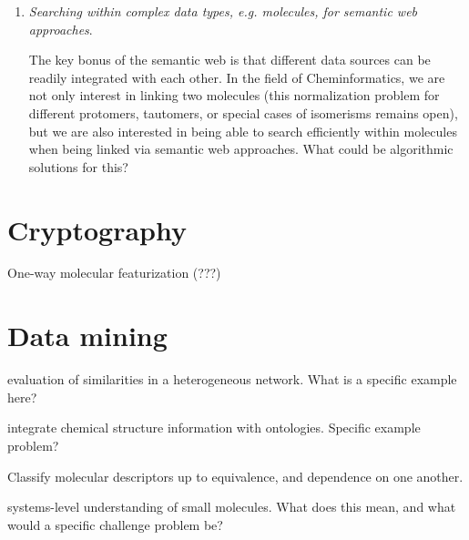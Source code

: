 \documentclass{sig-alternate}
\begin{document}
\begin{enumerate}
\item \emph{Searching within complex data types, e.g. molecules, for semantic web approaches}.

The key bonus of the semantic web is that different data sources can be readily integrated with each other. In the field
of Cheminformatics, we are not only interest in linking two molecules 
(this normalization problem for different protomers, tautomers, or special cases of isomerisms remains open), but we
are also interested in being able to search efficiently within molecules when being linked via semantic web approaches.
What could be algorithmic solutions for this?
\end{enumerate}

\section*{Cryptography}
One-way molecular featurization (???)

\section*{Data mining}
evaluation of similarities in a heterogeneous network.  What is a specific example here?

integrate chemical structure information with ontologies.  Specific example problem?

Classify molecular descriptors up to equivalence, and dependence on one another.

systems-level understanding of small molecules.  What does this mean, and what would a specific challenge problem be?
\end{document}
